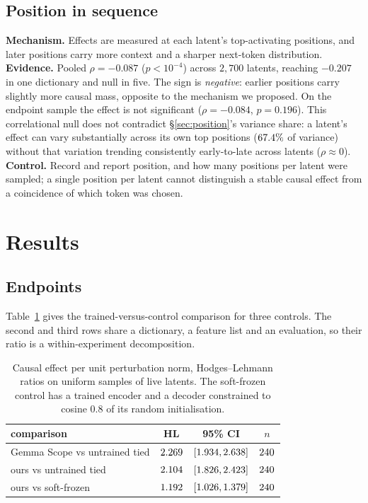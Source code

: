 \documentclass[11pt]{article}
\begin{document}
\subsection{Position in sequence}
\textbf{Mechanism.} Effects are measured at each latent's top-activating
positions, and later positions carry more context and a sharper next-token
distribution. \textbf{Evidence.} Pooled $\rho=-0.087$ ($p<10^{-4}$) across
$2{,}700$ latents, reaching $-0.207$ in one dictionary and null in five. The sign
is \emph{negative}: earlier positions carry slightly more causal mass, opposite to
the mechanism we proposed. On the endpoint sample the effect is not significant
($\rho=-0.084$, $p=0.196$). This correlational null does not contradict
\S\ref{sec:position}'s variance share: a latent's effect can vary substantially
across its own top positions ($67.4\%$ of variance) without that
variation trending consistently early-to-late across latents ($\rho\approx0$).
\textbf{Control.} Record and report position, and how many positions per latent
were sampled; a single position per latent cannot distinguish a stable causal
effect from a coincidence of which token was chosen.

\section{Results}
\label{sec:results}

\subsection{Endpoints}
Table~\ref{tab:endpoints} gives the trained-versus-control comparison for three
controls. The second and third rows share a dictionary, a feature list and an
evaluation, so their ratio is a within-experiment decomposition.

\begin{table}[t]\centering
\begin{tabular}{lccc}
\toprule
comparison & HL & 95\% CI & $n$ \\
\midrule
Gemma Scope vs untrained tied & $2.269$ & $[1.934, 2.638]$ & $240$ \\
ours vs untrained tied        & $2.104$ & $[1.826, 2.423]$ & $240$ \\
ours vs soft-frozen           & $1.192$ & $[1.026, 1.379]$ & $240$ \\
\bottomrule
\end{tabular}
\caption{Causal effect per unit perturbation norm, Hodges--Lehmann ratios on
uniform samples of live latents. The soft-frozen control has a trained encoder
and a decoder constrained to cosine $0.8$ of its random initialisation.}
\label{tab:endpoints}
\end{table}
\end{document}
